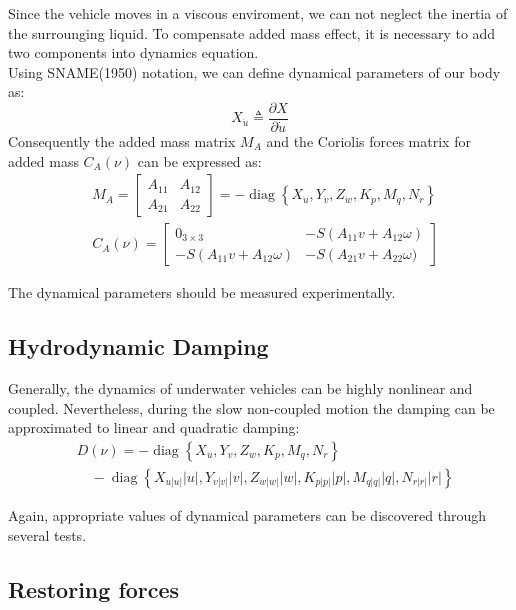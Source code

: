     Since the vehicle moves in a viscous enviroment, we can not neglect the inertia of the surrounging liquid.
    To compensate added mass effect, it is necessary to add two components into dynamics equation.\\
    Using SNAME(1950) notation, we can define dynamical parameters of our body as:
    $$
    X_{\dot{u}} \triangleq \frac{\partial X}{\partial \dot{u}}
    $$
    Consequently the added mass matrix $M_A$ and 
    the Coriolis forces matrix for added mass $C_A(\nu)$
    can be expressed as: 
    $$
    \begin{aligned}
        & M_A=\left[\begin{array}{cc}
            A_{11} & A_{12} \\
            A_{21} & A_{22}
            \end{array}\right]=-\operatorname{diag}\left\{X_{\dot{u}}, Y_{\dot{v}}, Z_{\dot{w}}, K_{\dot{p}}, M_{\dot{q}}, N_{\dot{r}}\right\} \\
        & C_A(\nu)=\left[\begin{array}{cc}
        0_{3 \times 3} & -S\left(A_{11} v+A_{12} \omega\right) \\
        -S\left(A_{11} v+A_{12} \omega\right) & -S\left(A_{21} v+A_{22} \omega)\right.
        \end{array}\right]
    \end{aligned}
    $$

    The dynamical parameters should be measured experimentally.

\subsection{Hydrodynamic Damping}

    Generally, the dynamics of underwater vehicles can be highly nonlinear and coupled.
    Nevertheless, during the slow non-coupled motion the damping can be approximated to linear and quadratic damping:
    $$\begin{aligned}
        & D(\nu)=-\operatorname{diag}\left\{X_u, Y_v, Z_w, K_p, M_q, N_r\right\} \\
        & \quad-\operatorname{diag}\left\{X_{u|u|}|u|, Y_{v|v|}|v|, Z_{w|w|}|w|, K_{p|p|}|p|, M_{q|q|}|q|, N_{r|r|}|r|\right\}
    \end{aligned}
    $$

    Again, appropriate values of dynamical parameters can be discovered through several tests.

\subsection{Restoring forces}

